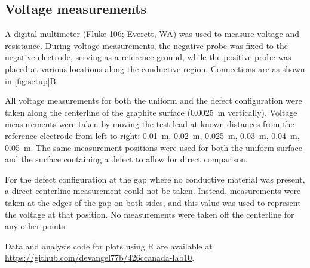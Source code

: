 \documentclass[10pt,journal,twoside]{IEEEtran} %
\begin{document}
\subsection{Voltage measurements}
A digital multimeter (Fluke 106; Everett, WA) was used to measure voltage and resistance. During voltage measurements, the negative probe was fixed to the negative electrode, serving as a reference ground, while the positive probe was placed at various locations along the conductive region. Connections are as shown in \cref{fig:setup}B. 

All voltage measurements for both the uniform and the defect configuration were taken along the centerline of the graphite surface (\qty{0.0025}{\meter} vertically). Voltage measurements were taken by moving the test lead at known distances from the reference electrode from left to right: \qty{0.01}{\meter}, \qty{0.02}{\meter}, \qty{0.025}{\meter}, \qty{0.03}{\meter}, \qty{0.04}{\meter}, \qty{0.05}{\meter}. The same measurement positions were used for both the uniform surface and the surface containing a defect to allow for direct comparison. 

For the defect configuration at the gap where no conductive material was present, a direct centerline measurement could not be taken. Instead, measurements were taken at the edges of the gap on both sides, and this value was used to represent the voltage at that position. No measurements were taken off the centerline for any other points.

Data and analysis code for plots using R \cite{R,ggplot2} are available at \url{https://github.com/devangel77b/426ccanada-lab10}. 

%

\end{document}
